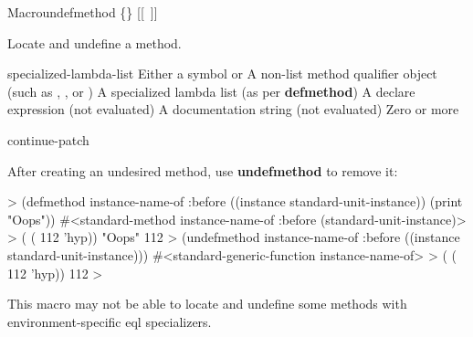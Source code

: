 \documentclass[10pt,twoside,english,pdftex]{article}
\begin{document}
\begin{functiondoc}{Macro}{undefmethod}{
    \{\}\superstar{}  
    \mbox{[[\superstar{} \vbar{} ]]}
    \superstar}
%
%
%
  
\fnsyntax

\fnpurpose Locate and undefine a method.

\fnpackage {}

\fnmodule {}

\fnargs
\begin{args}{specialized-lambda-list}
 Either a symbol or 
 A non-list method qualifier object (such as
, , or )
 A specialized lambda list (as per
\textbf{defmethod}) 
\arg[declarations] A declare expression (not evaluated)
\arg[documentation] A documentation string (not evaluated)
\arg[forms] Zero or more 
\end{args}

\begin{alsos}{continue-patch}
\also[patch]
\end{alsos}

\fnexample
{}%
%
After creating an undesired method, use \textbf{undefmethod} to remove it:
%
\W\supp
\begin{example}
  > (defmethod instance-name-of :before ((instance standard-unit-instance))
       (print "Oops"))
  #<standard-method instance-name-of :before (standard-unit-instance)>
  > ( ( 112 'hyp))
  "Oops" 
  112
  > (undefmethod instance-name-of :before ((instance standard-unit-instance)))
  #<standard-generic-function instance-name-of>
  > ( ( 112 'hyp))
  112
  >
\end{example}

\fnnote This macro may not be able to locate and undefine some methods with
environment-specific eql specializers.

\end{functiondoc}

\end{document}
